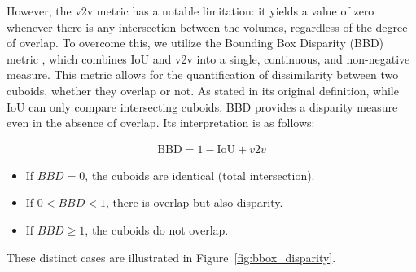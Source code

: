 However, the v2v metric has a notable limitation: it yields a value of zero whenever there is any intersection between the volumes, regardless of the degree of overlap. To overcome this, we utilize the Bounding Box Disparity (BBD) metric \cite{bounding_box_disparity}, which combines IoU and v2v into a single, continuous, and non-negative measure. This metric allows for the quantification of dissimilarity between two cuboids, whether they overlap or not. As stated in its original definition, while IoU can only compare intersecting cuboids, BBD provides a disparity measure even in the absence of overlap. Its interpretation is as follows:

\begin{equation}
    \begin{aligned}
    \text{BBD} = 1 - \text{IoU} + v2v
    \end{aligned}
    \label{eq:3d_metrics}
\end{equation}

\begin{itemize}
    \item If $BBD = 0$, the cuboids are identical (total intersection).
    \item If $0 < BBD < 1$, there is overlap but also disparity.
    \item If $BBD \geq 1$, the cuboids do not overlap.
\end{itemize}

These distinct cases are illustrated in Figure~\ref{fig:bbox_disparity}.

